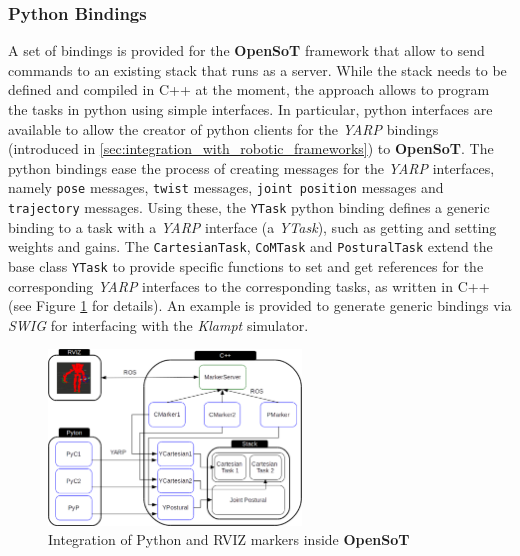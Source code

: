 \subsubsection{Python Bindings}
A set of bindings is provided for the \textbf{OpenSoT} framework that allow to send commands to an existing stack that runs as a server. While the stack needs to be defined and compiled in C++ at the moment, the approach allows to program the tasks in python using simple interfaces. In particular, python interfaces are available to allow the creator of python clients for the \emph{YARP} bindings (introduced in \ref{sec:integration_with_robotic_frameworks}) to \textbf{OpenSoT}. The python bindings ease the process of creating messages for the \emph{YARP} interfaces, namely \texttt{pose} messages, \texttt{twist} messages, \texttt{joint position} messages and \texttt{trajectory} messages. Using these, the \texttt{YTask} python binding defines a generic binding to a task with a \emph{YARP} interface (a \emph{YTask}), such as getting and setting weights and gains. The \texttt{CartesianTask}, \texttt{CoMTask} and \texttt{PosturalTask} extend the base class \texttt{YTask} to provide specific functions to set and get references for the corresponding \emph{YARP} interfaces to the corresponding tasks, as written in C++ (see Figure \ref{fig:python_binding} for details).
An example is provided to generate generic bindings via \emph{SWIG} for interfacing with the \emph{Klampt} simulator.
\begin{figure}
\vspace{2 mm}
\centering \includegraphics[width=0.6\textwidth]{images/software/python_markers.eps} 
\caption{Integration of Python and RVIZ markers inside \textbf{OpenSoT}} 
\label{fig:python_binding}
\end{figure}


